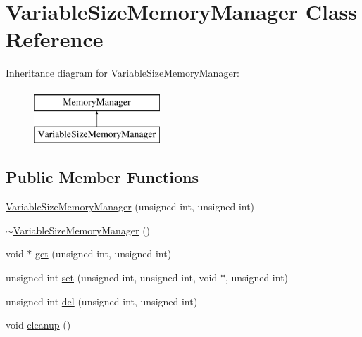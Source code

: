 \hypertarget{classVariableSizeMemoryManager}{
\section{VariableSizeMemoryManager Class Reference}
\label{classVariableSizeMemoryManager}
}
Inheritance diagram for VariableSizeMemoryManager:\begin{figure}[H]
\begin{center}
\leavevmode
\includegraphics[height=2cm]{classVariableSizeMemoryManager}
\end{center}
\end{figure}
\subsection*{Public Member Functions}
\begin{DoxyCompactItemize}
\item 
\hyperlink{classVariableSizeMemoryManager_ae7e72a8180b81def60c5c57078accd3e}{VariableSizeMemoryManager} (unsigned int, unsigned int)
\item 
\hyperlink{classVariableSizeMemoryManager_a32762e0e33c95bda77a7ff41813d0296}{$\sim$VariableSizeMemoryManager} ()
\item 
void $\ast$ \hyperlink{classVariableSizeMemoryManager_a9be29ac3fbaba3824820d6d9a6e81243}{get} (unsigned int, unsigned int)
\item 
unsigned int \hyperlink{classVariableSizeMemoryManager_af13ce44cb2a151e6e31723b29e6a129d}{set} (unsigned int, unsigned int, void $\ast$, unsigned int)
\item 
unsigned int \hyperlink{classVariableSizeMemoryManager_a7fca71f5a112a22d52a8ebf7ce4984a5}{del} (unsigned int, unsigned int)
\item 
void \hyperlink{classVariableSizeMemoryManager_a554860923dc36f775fd5037078a42aeb}{cleanup} ()
\end{DoxyCompactItemize}


